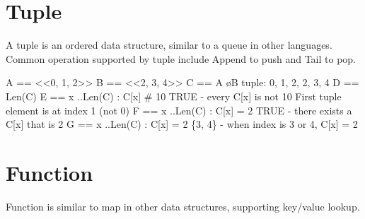 \section{Tuple}

A tuple is an ordered data structure, similar to a queue in other languages.
Common operation supported by tuple include Append to push and Tail to pop.
\newline

\begin{tla}
A == <<0, 1, 2>>                    
B == <<2, 3, 4>>
C == A \o B                         \* tuple: 0, 1, 2, 2, 3, 4
D == Len(C)                         
E == \A x ..Len(C) : C[x] # 10 \* TRUE - every C[x] is not 10
                                    \* First tuple element is at index 1 (not 0)
F == \E x ..Len(C) : C[x] = 2  \* TRUE - there exists a C[x] that is 2
G == {x ..Len(C) : C[x] = 2}   \* \{3, 4\} - when index is 3 or 4, C[x] = 2
\end{tla}
\begin{tlatex}
%
%
%
%
\@xx{}%
%
%
\@xx{}%
%
\@xx{}%
%
%
\@xx{}%
%
\@xx{}%
%
\@xx{}%
\end{tlatex}

\section{Function}

Function is similar to map in other data structures, supporting key/value
lookup.

